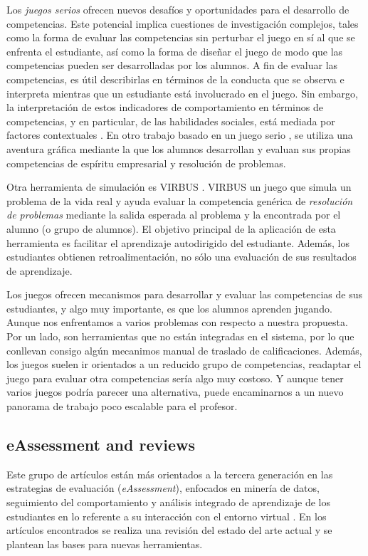 Los \emph{juegos serios} ofrecen nuevos desafíos y oportunidades para el desarrollo de competencias. Este potencial implica cuestiones de investigación complejos, tales como la forma de evaluar las competencias sin perturbar el juego en sí al que se enfrenta el estudiante, así como la forma de diseñar el juego de modo que las competencias pueden ser desarrolladas por los alumnos. A fin de evaluar las competencias, es útil describirlas en términos de la conducta que se observa e interpreta mientras que un estudiante está involucrado en el juego. Sin embargo, la interpretación de estos indicadores de comportamiento en términos de competencias, y en particular, de las habilidades sociales, está mediada por factores contextuales \cite{Bedek:2011}. En otro trabajo basado en un juego serio \cite{Guenaga:2013}, se utiliza una aventura gráfica mediante la que los alumnos desarrollan y evaluan sus propias competencias de espíritu empresarial y resolución de problemas.

Otra herramienta de simulación es VIRBUS \cite{Starcic:2008,Starcic:2008a}. VIRBUS un juego que simula un problema de la vida real y ayuda evaluar la competencia genérica de \emph{resolución de problemas} mediante la salida esperada al problema y la encontrada por el alumno (o grupo de alumnos). El objetivo principal de la aplicación de esta herramienta es facilitar el aprendizaje autodirigido del estudiante. Además, los estudiantes obtienen retroalimentación, no sólo una evaluación de sus resultados de aprendizaje.

Los juegos ofrecen mecanismos para desarrollar y evaluar las competencias de sus estudiantes, y algo muy importante, es que los alumnos aprenden jugando. Aunque nos enfrentamos a varios problemas con respecto a nuestra propuesta. Por un lado, son herramientas que no están integradas en el sistema, por lo que conllevan consigo algún mecanimos manual de traslado de calificaciones. Además, los juegos suelen ir orientados a un reducido grupo de competencias, readaptar el juego para evaluar otra competencias sería algo muy costoso. Y aunque tener varios juegos podría parecer una alternativa, puede encaminarnos a un nuevo panorama de trabajo poco escalable para el profesor. 


\subsection{eAssessment and reviews}
Este grupo de artículos están más orientados a la tercera generación en las estrategias de evaluación (\emph{eAssessment}), enfocados en minería de datos, seguimiento del comportamiento y análisis integrado de aprendizaje de los estudiantes en lo referente a su interacción con el entorno virtual \cite{Redecker:2012,Redecker:2013}. En los artículos encontrados se realiza una revisión del estado del arte actual y se plantean las bases para nuevas herramientas.

